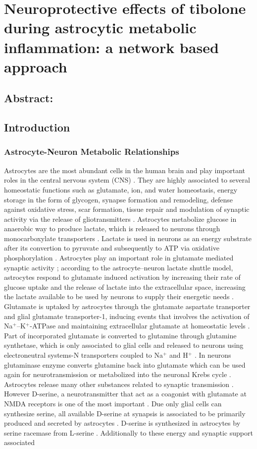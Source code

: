 \chapter{Neuroprotective effects of tibolone during astrocytic metabolic inflammation: a network based approach}
\section*{Abstract:}
\section{Introduction}
\subsection*{Astrocyte-Neuron Metabolic Relationships}
Astrocytes are the most abundant cells in the human brain and play important roles in the central nervous system (CNS) \cite{Takuma2004}. They are highly associated to several homeostatic functions such as glutamate, ion, and water homeostasis, energy storage in the form of glycogen, synapse formation and remodeling, defense against oxidative stress, scar formation, tissue repair and modulation of synaptic activity via the release of gliotransmitters \cite{Lange2012}. Astrocytes metabolize glucose in anaerobic way to produce lactate, which is released to neurons through monocarboxylate transporters \cite{Kimelberg2010}. Lactate is used in neurons as an energy substrate after its convertion to pyruvate and subsequently to ATP via oxidative phosphorylation \cite{Allen2009}. Astrocytes play an important role in glutamate mediated synaptic activity \cite{Halassa2010}; according to the astrocyte–neuron lactate shuttle model, astrocytes respond to glutamate induced activation by increasing their rate of glucose uptake and the release of lactate into the extracellular space, increasing the lactate available to be used by neurons to supply their energetic needs \cite{Giaume2010}. Glutamate is uptaked by astrocytes through the glutamate aspartate transporter and glial glutamate transporter-1, inducing events that involves the activation of Na$^+$–K$^+$-ATPase and maintaining extracellular glutamate at homeostatic levels \cite{Nijboer2013}. Part of incorporated glutamate is converted to glutamine through glutamine synthetase, which is only associated to glial cells and released to neurons using electroneutral systems-N transporters coupled to Na$^+$ and H$^+$ \cite{Barres2008}. In neurons glutaminase enzyme converts glutamine back into glutamate which can be used again for neurotransmission or metabolized into the neuronal Krebs cycle \cite{Shen2013}. Astrocytes release many other substances related to synaptic transmission \cite{Petrelli2016}. However D-serine, a neurotransmitter that act as a coagonist with glutamate at NMDA receptors is one of the most important \cite{Halassa2010}. Due only glial cells can synthesize serine, all available D-serine at synapsis is associated to be primarily produced and secreted by astrocytes \cite{Barres2008}. D-serine is synthesized in astrocytes by serine racemase from L-serine \cite{Durrant2014}. Additionally to these energy and synaptic support associated 